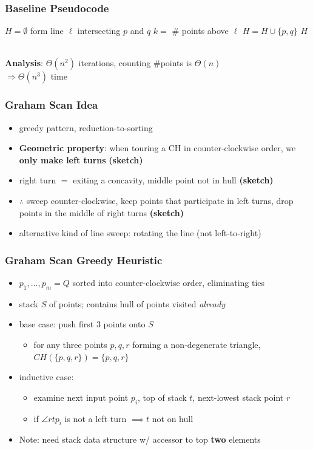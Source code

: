 \documentclass{beamer}
\newcommand{\stanza}{ \\~\ }
\begin{document}
\begin{frame} \frametitle{Baseline Pseudocode}
  {\small
\begin{algorithmic}[1]
    \State $H=\emptyset$
      \State form line $\ell$ intersecting $p$ and $q$
      \State $k = $ \# points above $\ell$
        \State $H = H \cup \{p, q\}$
      \EndIf
    \EndFor
    \State \Return $H$
  \EndFunction \stanza
\end{algorithmic}
}

\textbf{Analysis}: $\Theta(n^2)$ iterations, counting \#points is $\Theta(n)$ \\
$\Longrightarrow \Theta(n^3)$ time
\end{frame}

\begin{frame} \frametitle{Graham Scan Idea}
\begin{itemize}
  \item greedy pattern, reduction-to-sorting
  \item \textbf{Geometric property}: when touring a CH in counter-clockwise order, we
    \textbf{only make left turns} \textbf{(sketch)}
  \item right turn $=$ exiting a concavity, middle point not in hull \textbf{(sketch)}
  \item $\therefore$ sweep counter-clockwise, keep points that participate in left
    turns, drop points in the middle of right turns \textbf{(sketch)}
  \item alternative kind of line sweep: rotating the line (not left-to-right)
\end{itemize}
\end{frame}

\begin{frame} \frametitle{Graham Scan Greedy Heuristic}
\begin{itemize}
  \item $p_1, \ldots, p_m = Q$ sorted into counter-clockwise order, eliminating ties
  \item stack $S$ of points; contains hull of points visited \emph{already}
  \item base case: push first 3 points onto $S$
  \begin{itemize}
    \item for any three points $p, q, r$ forming a non-degenerate triangle,
      $CH(\{p, q, r\}) = \{p, q, r\}$
    \end{itemize}
  \item inductive case:
    \begin{itemize}
      \item examine next input point $p_i$, top of stack $t$, next-lowest stack point $r$
      \item if $\angle r t p_i$ is not a left turn $\implies t$ not on hull
    \end{itemize}
  \item Note: need stack data structure w/ accessor to top \textbf{two} elements
  \end{itemize}
\end{frame}
\end{document}

